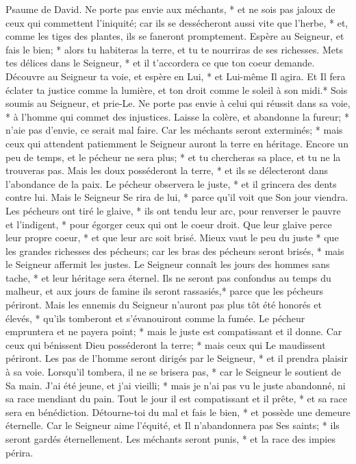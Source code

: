 Psaume de David. Ne porte pas envie aux méchants, * et ne sois pas jaloux de ceux qui commettent l'iniquité;
car ils se dessécheront aussi vite que l'herbe, * et, comme les tiges des plantes, ils se faneront promptement.
Espère au Seigneur, et fais le bien; * alors tu habiteras la terre, et tu te nourriras de ses richesses.
Mets tes délices dans le Seigneur, * et il t'accordera ce que ton coeur demande.
Découvre au Seigneur ta voie, et espère en Lui, * et Lui-même Il agira.
Et Il fera éclater ta justice comme la lumière, et ton droit comme le soleil à son midi.*
Sois soumis au Seigneur, et prie-Le. Ne porte pas envie à celui qui réussit dans sa voie, * à l'homme qui commet des injustices.
Laisse la colère, et abandonne la fureur; * n'aie pas d'envie, ce serait mal faire.
Car les méchants seront exterminés; * mais ceux qui attendent patiemment le Seigneur auront la terre en héritage.
Encore un peu de temps, et le pécheur ne sera plus; * et tu chercheras sa place, et tu ne la trouveras pas.
Mais les doux posséderont la terre, * et ils se délecteront dans l'abondance de la paix.
Le pécheur observera le juste, * et il grincera des dents contre lui.
Mais le Seigneur Se rira de lui, * parce qu'il voit que Son jour viendra.
Les pécheurs ont tiré le glaive, * ils ont tendu leur arc, pour renverser le pauvre et l'indigent, * pour égorger ceux qui ont le coeur droit.
Que leur glaive perce leur propre coeur, * et que leur arc soit brisé.
Mieux vaut le peu du juste * que les grandes richesses des pécheurs;
car les bras des pécheurs seront brisés, * mais le Seigneur affermit les justes.
Le Seigneur connaît les jours des hommes sans tache, * et leur héritage sera éternel.
Ils ne seront pas confondus au temps du malheur, et aux jours de famine ils seront rassasiés,*
parce que les pécheurs périront. Mais les ennemis du Seigneur n'auront pas plus tôt été honorés et élevés, * qu'ils tomberont et s'évanouiront comme la fumée.
Le pécheur empruntera et ne payera point; * mais le juste est compatissant et il donne.
Car ceux qui bénissent Dieu posséderont la terre; * mais ceux qui Le maudissent périront.
Les pas de l'homme seront dirigés par le Seigneur, * et il prendra plaisir à sa voie.
Lorsqu'il tombera, il ne se brisera pas, * car le Seigneur le soutient de Sa main.
J'ai été jeune, et j'ai vieilli; * mais je n'ai pas vu le juste abandonné, ni sa race mendiant du pain.
Tout le jour il est compatissant et il prête, * et sa race sera en bénédiction.
Détourne-toi du mal et fais le bien, * et possède une demeure éternelle.
Car le Seigneur aime l'équité, et Il n'abandonnera pas Ses saints; * ils seront gardés éternellement. Les méchants seront punis, * et la race des impies périra.
